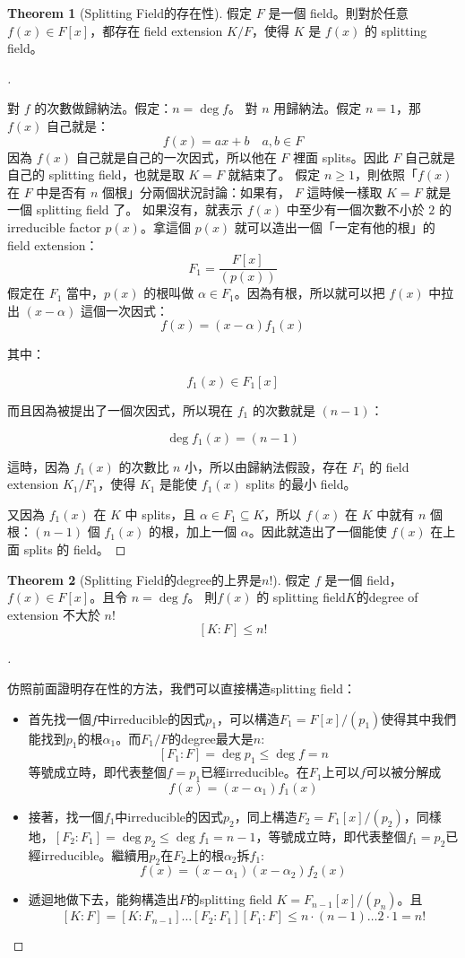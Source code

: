\documentclass{article}
\theoremstyle{definition}
\newtheorem{thm}{Theorem}
\newenvironment{proofs}[1][\proofname]{%
  \begin{proof}[#1]$ $\par\nobreak\ignorespaces
}{%
  \end{proof}
}
\begin{document}
\begin{thm}[Splitting Field的存在性]
	假定 $F$ 是一個 field。則對於任意 $f(x) \in F[x]$，都存在 field extension $K/F$，使得 $K$ 是 $f(x)$ 的 splitting field。
\end{thm}

\begin{proofs}
	對 $f$ 的次數做歸納法。假定：$	n = \deg f$。
	對 $n$ 用歸納法。假定 $n = 1$，那 $f(x)$ 自己就是：
	$$
	f(x) = ax + b \quad a, b \in F
	$$
	因為 $f(x)$ 自己就是自己的一次因式，所以他在 $F$ 裡面 splits。因此 $F$ 自己就是自己的 splitting field，也就是取 $K = F$ 就結束了。
	假定 $n \geq 1$，則依照「$f(x)$ 在 $F$ 中是否有 $n$ 個根」分兩個狀況討論：如果有， $F$ 這時候一樣取 $K = F$ 就是一個 splitting field 了。
	如果沒有，就表示 $f(x)$ 中至少有一個次數不小於 $2$ 的 irreducible factor  $p(x)$。拿這個 $p(x)$ 就可以造出一個「一定有他的根」的 field extension：
	$$
	F_1 = \frac {F[x]}{(p(x))}
	$$
	假定在 $F_1$ 當中，$p(x)$ 的根叫做 $\alpha \in F_1$。因為有根，所以就可以把 $f(x)$ 中拉出 $(x - \alpha)$ 這個一次因式：
	$$
	f(x) = (x - \alpha)f_1(x) 
	$$
	
	其中：
	
	$$
	f_1(x) \in F_1[x]
	$$
	
	而且因為被提出了一個次因式，所以現在 $f_1$ 的次數就是 $(n - 1)$：
	
	$$
	\deg f_1(x) = (n - 1)
	$$
	
	這時，因為 $f_1(x)$ 的次數比 $n$ 小，所以由歸納法假設，存在 $F_1$ 的 field extension  $K_1/F_1$，使得 $K_1$ 是能使 $f_1(x)$ splits 的最小 field。
	
	又因為 $f_1(x)$ 在 $K$ 中 splits，且 $\alpha \in F_1 \subseteq K$，所以 $f(x)$ 在 $K$ 中就有 $n$ 個根：$(n - 1)$ 個 $f_1(x)$ 的根，加上一個 $\alpha$。因此就造出了一個能使 $f(x)$ 在上面 splits 的 field。
\end{proofs}

\begin{thm}[Splitting Field的degree的上界是$n!$]
	假定 $f$ 是一個 field，$f(x) \in F[x]$。且令 $n=\deg f$。
則$f(x)$ 的 splitting field$K$的degree of extension 不大於 $n!$
$$
[K:F] \leq n!
$$
\end{thm}

\begin{proofs}
	仿照前面證明存在性的方法，我們可以直接構造splitting field：
	\begin{itemize}
		\item 首先找一個$f$中irreducible的因式$p_1$，可以構造$F_1=F[x]/(p_1)$使得其中我們能找到$p_1$的根$\alpha_1$。而$F_1/F$的degree最大是$n$:
		\[ [F_1:F]=\deg p_1\le \deg f=n\]
		等號成立時，即代表整個$f=p_1$已經irreducible。在$F_1$上可以$f$可以被分解成
		\[f(x)=(x-\alpha_1)f_1(x)\]
		\item 接著，找一個$f_1$中irreducible的因式$p_2$，同上構造$F_2=F_1[x]/(p_2)$，同樣地，$[F_2:F_1]=\deg p_2 \le \deg f_1=n-1$，等號成立時，即代表整個$f_1=p_2$已經irreducible。繼續用$p_2$在$F_2$上的根$\alpha_2$拆$f_1$:
		\[f(x)=(x-\alpha_1)(x-\alpha_2)f_2(x)\]
		\item 遞迴地做下去，能夠構造出$F$的splitting field $K=F_{n-1}[x]/(p_n)$。且
		\[[K:F]= [K:F_{n-1}]\dots[F_2:F_1][F_1:F] \le n\cdot(n-1)\dots 2 \cdot 1 = n!\]
	\end{itemize}
\end{proofs}
\end{document}
